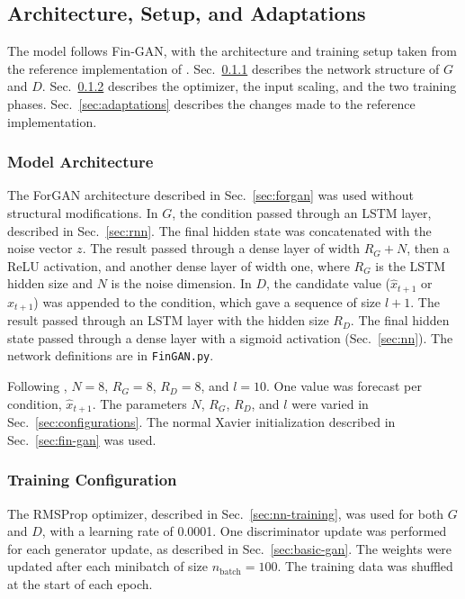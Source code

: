 \subsection{Architecture, Setup, and Adaptations}\label{sec:model}
The model follows Fin-GAN, with the architecture and training setup taken from the reference implementation of \textcite{vuleticFinGANForecastingClassifying2024}. Sec.~\ref{sec:architecture} describes the network structure of $G$ and $D$. Sec.~\ref{sec:training-config} describes the optimizer, the input scaling, and the two training phases. Sec.~\ref{sec:adaptations} describes the changes made to the reference implementation.

\subsubsection{Model Architecture}\label{sec:architecture}
The ForGAN architecture described in Sec.~\ref{sec:forgan} was used without structural modifications. In $G$, the condition passed through an LSTM layer, described in Sec.~\ref{sec:rnn}. The final hidden state was concatenated with the noise vector $z$. The result passed through a dense layer of width $R_G+N$, then a ReLU activation, and another dense layer of width one, where $R_G$ is the LSTM hidden size and $N$ is the noise dimension.
In $D$, the candidate value ($\hat{x}_{t+1}$ or $x_{t+1}$) was appended to the condition, which gave a sequence of size $l+1$. The result passed through an LSTM layer with the hidden size $R_D$. The final hidden state passed through a dense layer with a sigmoid activation (Sec.~\ref{sec:nn}). The network definitions are in \texttt{FinGAN.py}.

Following \textcite{vuleticFinGANForecastingClassifying2024}, $N=8$, $R_G=8$, $R_D=8$, and $l=10$. One value was forecast per condition,
$\hat{x}_{t+1}$. The parameters $N$, $R_G$, $R_D$, and $l$ were varied in Sec.~\ref{sec:configurations}. The normal Xavier initialization described in Sec.~\ref{sec:fin-gan} was used.

\subsubsection{Training Configuration}\label{sec:training-config}
The RMSProp optimizer, described in Sec.~\ref{sec:nn-training}, was used for both $G$ and $D$, with a learning rate of \num{0.0001}. One discriminator update was performed for each generator update, as described in Sec.~\ref{sec:basic-gan}. The weights were updated after each minibatch of size $n_{\text{batch}}=100$. The training data was shuffled at the start of each epoch.


